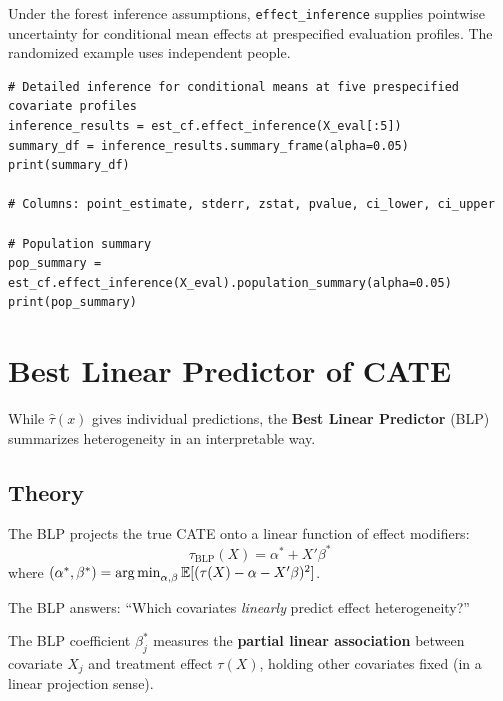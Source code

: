 Under the forest inference assumptions, \texttt{effect\_inference} supplies pointwise uncertainty for conditional mean effects at prespecified evaluation profiles. The randomized example uses independent people.

\begin{verbatim}
# Detailed inference for conditional means at five prespecified covariate profiles
inference_results = est_cf.effect_inference(X_eval[:5])
summary_df = inference_results.summary_frame(alpha=0.05)
print(summary_df)

# Columns: point_estimate, stderr, zstat, pvalue, ci_lower, ci_upper

# Population summary
pop_summary = est_cf.effect_inference(X_eval).population_summary(alpha=0.05)
print(pop_summary)
\end{verbatim}


\section{Best Linear Predictor of CATE}\label{sec:ch09_blp}

While $\hat{\tau}(x)$ gives individual predictions, the \textbf{Best Linear Predictor} (BLP) summarizes heterogeneity in an interpretable way.

\subsection{Theory}

\begin{definition}
\label{def:blp}
The BLP projects the true CATE onto a linear function of effect modifiers:
\begin{equation}
\tau_{\text{BLP}}(X) = \alpha^* + X'\beta^*
\end{equation}
where $(\alpha^*,\beta^*) = \operatorname*{arg\,min}_{\alpha,\beta} \mathbb{E}[(\tau(X) - \alpha - X'\beta)^2]$.

The BLP answers: ``Which covariates \textit{linearly} predict effect heterogeneity?''
\end{definition}

\begin{theorem}
\label{thm:blp_interpretation}
The BLP coefficient $\beta^*_j$ measures the \textbf{partial linear association} between covariate $X_j$ and treatment effect $\tau(X)$, holding other covariates fixed (in a linear projection sense).
\end{theorem}

